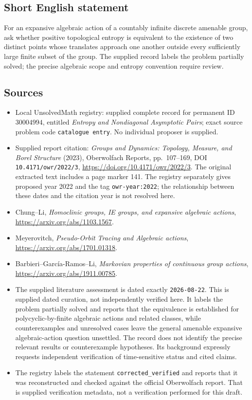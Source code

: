 \documentclass[11pt]{article}
\begin{document}
\subsection{Short English statement}
For an expansive algebraic action of a countably infinite discrete amenable group, ask whether positive topological entropy is equivalent to the existence of two distinct points whose translates approach one another outside every sufficiently large finite subset of the group. The supplied record labels the problem partially solved; the precise algebraic scope and entropy convention require review.
\subsection{Sources}
\begin{itemize}
\item Local UnsolvedMath registry: supplied complete record for permanent ID \(30004994\), entitled \emph{Entropy and Nondiagonal Asymptotic Pairs}; exact source problem code \texttt{catalogue entry}. No individual proposer is supplied.
\item Supplied report citation: \emph{Groups and Dynamics: Topology, Measure, and Borel Structure} (2023), Oberwolfach Reports, pp.\ 107--169, DOI \texttt{10.4171/owr/2022/3}, \url{https://doi.org/10.4171/owr/2022/3}. The original extracted text includes a page marker 141. The registry separately gives proposed year 2022 and the tag \texttt{owr-year:2022}; the relationship between these dates and the citation year is not resolved here.
\item Chung--Li, \emph{Homoclinic groups, IE groups, and expansive algebraic actions}, \url{https://arxiv.org/abs/1103.1567}.
\item Meyerovitch, \emph{Pseudo-Orbit Tracing and Algebraic actions}, \url{https://arxiv.org/abs/1701.01318}.
\item Barbieri--Garc\'ia-Ramos--Li, \emph{Markovian properties of continuous group actions}, \url{https://arxiv.org/abs/1911.00785}.
\item The supplied literature assessment is dated exactly \texttt{2026-08-22}. This is supplied dated curation, not independently verified here. It labels the problem partially solved and reports that the equivalence is established for polycyclic-by-finite algebraic actions and related classes, while counterexamples and unresolved cases leave the general amenable expansive algebraic-action question unsettled. The record does not identify the precise relevant results or counterexample hypotheses. Its background expressly requests independent verification of time-sensitive status and cited claims.
\item The registry labels the statement \texttt{corrected\_verified} and reports that it was reconstructed and checked against the official Oberwolfach report. That is supplied verification metadata, not a verification performed for this draft.
\end{itemize}
\end{document}
